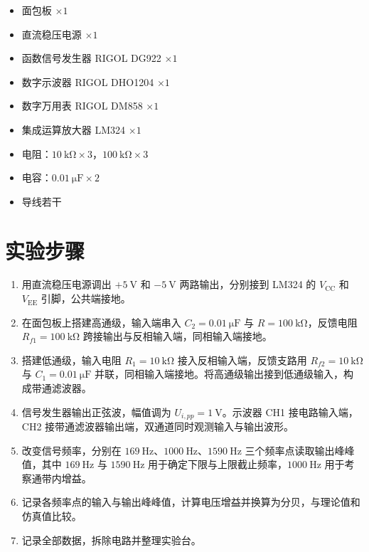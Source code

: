 \begin{itemize}
    \item 面包板 $\times 1$
    \item 直流稳压电源 $\times 1$
    \item 函数信号发生器 RIGOL DG922 $\times 1$
    \item 数字示波器 RIGOL DHO1204 $\times 1$
    \item 数字万用表 RIGOL DM858 $\times 1$
    \item 集成运算放大器 LM324 $\times 1$
    \item 电阻：$\SI{10}{\kilo\ohm} \times 3$，$\SI{100}{\kilo\ohm} \times 3$
    \item 电容：$\SI{0.01}{\micro\farad} \times 2$
    \item 导线若干
\end{itemize}

\section{实验步骤}

\begin{enumerate}[label=\arabic*.]
    \item 用直流稳压电源调出 $+\SI{5}{\volt}$ 和 $-\SI{5}{\volt}$ 两路输出，分别接到 LM324 的 $V_{\mathrm{CC}}$ 和 $V_{\mathrm{EE}}$ 引脚，公共端接地。
    \item 在面包板上搭建高通级，输入端串入 $C_2 = \SI{0.01}{\micro\farad}$ 与 $R = \SI{100}{\kilo\ohm}$，反馈电阻 $R_{f1} = \SI{100}{\kilo\ohm}$ 跨接输出与反相输入端，同相输入端接地。
    \item 搭建低通级，输入电阻 $R_1 = \SI{10}{\kilo\ohm}$ 接入反相输入端，反馈支路用 $R_{f2} = \SI{10}{\kilo\ohm}$ 与 $C_1 = \SI{0.01}{\micro\farad}$ 并联，同相输入端接地。将高通级输出接到低通级输入，构成带通滤波器。
    \item 信号发生器输出正弦波，幅值调为 $U_{i,pp} = \SI{1}{\volt}$。示波器 CH1 接电路输入端，CH2 接带通滤波器输出端，双通道同时观测输入与输出波形。
    \item 改变信号频率，分别在 $\SI{169}{\hertz}$、$\SI{1000}{\hertz}$、$\SI{1590}{\hertz}$ 三个频率点读取输出峰峰值，其中 $\SI{169}{\hertz}$ 与 $\SI{1590}{\hertz}$ 用于确定下限与上限截止频率，$\SI{1000}{\hertz}$ 用于考察通带内增益。
    \item 记录各频率点的输入与输出峰峰值，计算电压增益并换算为分贝，与理论值和仿真值比较。
    \item 记录全部数据，拆除电路并整理实验台。
\end{enumerate}

